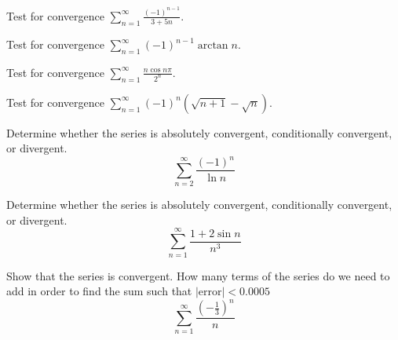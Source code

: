 \documentclass[
  course = {{MATH102 Calculus II}},
  quartile = {{2}},
  assignment = 22,%
  topic = {{11.5: Alternating Series and Absolute Convergence}},
  firstexercise = 1,
  term = 202
]{aga-homework}
\begin{document}

\newpage

\problem Test for convergence $\displaystyle \sum_{n=1}^{\infty}\frac{(-1)^{n-1}}{3+5n}$.

\newpage

\problem Test for convergence $\displaystyle \sum_{n=1}^{\infty}{(-1)^{n-1}\arctan n}$.

\newpage

\problem Test for convergence $\displaystyle \sum_{n=1}^{\infty}\frac{n\cos n\pi}{2^n}$.

\newpage

\problem Test for convergence $\displaystyle \sum_{n=1}^{\infty}{(-1)^{n}(\sqrt{n+1}-\sqrt{n})}$.

\newpage

\problem Determine whether the series is absolutely convergent, conditionally convergent, or divergent. 
$$\displaystyle \sum_{n=2}^{\infty}\frac{(-1)^{n}}{\ln n}$$

\newpage

\problem Determine whether the series is absolutely convergent, conditionally convergent, or divergent.
$$\displaystyle \sum_{n=1}^{\infty}\frac{1+2\sin n}{n^3}$$

\newpage

\problem Show that the series is convergent. How many terms of the series do we need to add in order to find the sum such that $|\text{error}|<0.0005$
$$\displaystyle \sum_{n=1}^{\infty}\frac{\left(-\frac{1}{3}\right)^n}{n}$$


\newpage
\afterpage{\null\newpage}

\afterpage{\null\newpage}

\afterpage{\null\newpage}
\end{document}
